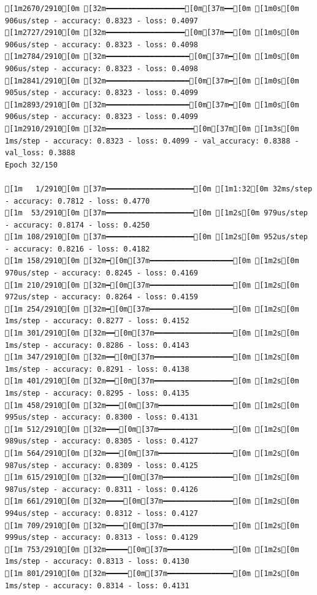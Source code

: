 \documentclass[
  letterpaper,
  DIV=11,
  numbers=noendperiod]{scrartcl}
\begin{document}
\begin{verbatim}
[1m2670/2910[0m [32m━━━━━━━━━━━━━━━━━━[0m[37m━━[0m [1m0s[0m 906us/step - accuracy: 0.8323 - loss: 0.4097
[1m2727/2910[0m [32m━━━━━━━━━━━━━━━━━━[0m[37m━━[0m [1m0s[0m 906us/step - accuracy: 0.8323 - loss: 0.4098
[1m2784/2910[0m [32m━━━━━━━━━━━━━━━━━━━[0m[37m━[0m [1m0s[0m 906us/step - accuracy: 0.8323 - loss: 0.4098
[1m2841/2910[0m [32m━━━━━━━━━━━━━━━━━━━[0m[37m━[0m [1m0s[0m 905us/step - accuracy: 0.8323 - loss: 0.4099
[1m2893/2910[0m [32m━━━━━━━━━━━━━━━━━━━[0m[37m━[0m [1m0s[0m 906us/step - accuracy: 0.8323 - loss: 0.4099
[1m2910/2910[0m [32m━━━━━━━━━━━━━━━━━━━━[0m[37m[0m [1m3s[0m 1ms/step - accuracy: 0.8323 - loss: 0.4099 - val_accuracy: 0.8388 - val_loss: 0.3888
Epoch 32/150

[1m   1/2910[0m [37m━━━━━━━━━━━━━━━━━━━━[0m [1m1:32[0m 32ms/step - accuracy: 0.7812 - loss: 0.4770
[1m  53/2910[0m [37m━━━━━━━━━━━━━━━━━━━━[0m [1m2s[0m 979us/step - accuracy: 0.8174 - loss: 0.4250 
[1m 108/2910[0m [37m━━━━━━━━━━━━━━━━━━━━[0m [1m2s[0m 952us/step - accuracy: 0.8216 - loss: 0.4182
[1m 158/2910[0m [32m━[0m[37m━━━━━━━━━━━━━━━━━━━[0m [1m2s[0m 970us/step - accuracy: 0.8245 - loss: 0.4169
[1m 210/2910[0m [32m━[0m[37m━━━━━━━━━━━━━━━━━━━[0m [1m2s[0m 972us/step - accuracy: 0.8264 - loss: 0.4159
[1m 254/2910[0m [32m━[0m[37m━━━━━━━━━━━━━━━━━━━[0m [1m2s[0m 1ms/step - accuracy: 0.8277 - loss: 0.4152  
[1m 301/2910[0m [32m━━[0m[37m━━━━━━━━━━━━━━━━━━[0m [1m2s[0m 1ms/step - accuracy: 0.8286 - loss: 0.4143
[1m 347/2910[0m [32m━━[0m[37m━━━━━━━━━━━━━━━━━━[0m [1m2s[0m 1ms/step - accuracy: 0.8291 - loss: 0.4138
[1m 401/2910[0m [32m━━[0m[37m━━━━━━━━━━━━━━━━━━[0m [1m2s[0m 1ms/step - accuracy: 0.8295 - loss: 0.4135
[1m 458/2910[0m [32m━━━[0m[37m━━━━━━━━━━━━━━━━━[0m [1m2s[0m 995us/step - accuracy: 0.8300 - loss: 0.4131
[1m 512/2910[0m [32m━━━[0m[37m━━━━━━━━━━━━━━━━━[0m [1m2s[0m 989us/step - accuracy: 0.8305 - loss: 0.4127
[1m 564/2910[0m [32m━━━[0m[37m━━━━━━━━━━━━━━━━━[0m [1m2s[0m 987us/step - accuracy: 0.8309 - loss: 0.4125
[1m 615/2910[0m [32m━━━━[0m[37m━━━━━━━━━━━━━━━━[0m [1m2s[0m 987us/step - accuracy: 0.8311 - loss: 0.4126
[1m 661/2910[0m [32m━━━━[0m[37m━━━━━━━━━━━━━━━━[0m [1m2s[0m 994us/step - accuracy: 0.8312 - loss: 0.4127
[1m 709/2910[0m [32m━━━━[0m[37m━━━━━━━━━━━━━━━━[0m [1m2s[0m 999us/step - accuracy: 0.8313 - loss: 0.4129
[1m 753/2910[0m [32m━━━━━[0m[37m━━━━━━━━━━━━━━━[0m [1m2s[0m 1ms/step - accuracy: 0.8313 - loss: 0.4130  
[1m 801/2910[0m [32m━━━━━[0m[37m━━━━━━━━━━━━━━━[0m [1m2s[0m 1ms/step - accuracy: 0.8314 - loss: 0.4131

\end{verbatim}
\end{document}
